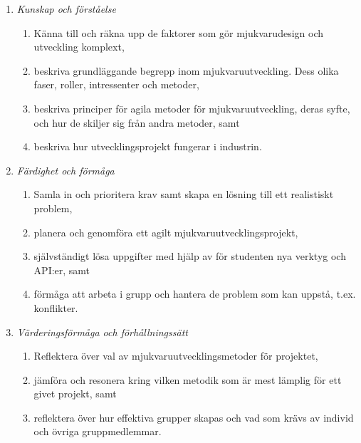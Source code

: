 \begin{enumerate}
\def\labelenumi{\Alph{enumi}.}
\tightlist
\item
  \emph{Kunskap och förståelse}

  \begin{enumerate}
  \def\labelenumii{\Alph{enumi}.\arabic{enumii}.}
  \tightlist
  \item
    Känna till och räkna upp de faktorer som gör mjukvarudesign och
    utveckling komplext,
  \item
    beskriva grundläggande begrepp inom mjukvaruutveckling. Dess olika
    faser, roller, intressenter och metoder,
  \item
    beskriva principer för agila metoder för mjukvaruutveckling, deras
    syfte, och hur de skiljer sig från andra metoder, samt
  \item
    beskriva hur utvecklingsprojekt fungerar i industrin.
  \end{enumerate}
\item
  \emph{Färdighet och förmåga}

  \begin{enumerate}
  \def\labelenumii{\Alph{enumi}.\arabic{enumii}.}
  \tightlist
  \item
    Samla in och prioritera krav samt skapa en lösning till ett
    realistiskt problem,
  \item
    planera och genomföra ett agilt mjukvaruutvecklingsprojekt,
  \item
    självständigt lösa uppgifter med hjälp av för studenten nya verktyg
    och API:er, samt
  \item
    förmåga att arbeta i grupp och hantera de problem som kan uppstå,
    t.ex. konflikter.
  \end{enumerate}
\item
  \emph{Värderingsförmåga och förhållningssätt}

  \begin{enumerate}
  \def\labelenumii{\Alph{enumi}.\arabic{enumii}.}
  \tightlist
  \item
    Reflektera över val av mjukvaruutvecklingsmetoder för projektet,
  \item
    jämföra och resonera kring vilken metodik som är mest lämplig för
    ett givet projekt, samt
  \item
    reflektera över hur effektiva grupper skapas och vad som krävs av
    individ och övriga gruppmedlemmar.
  \end{enumerate}
\end{enumerate}

